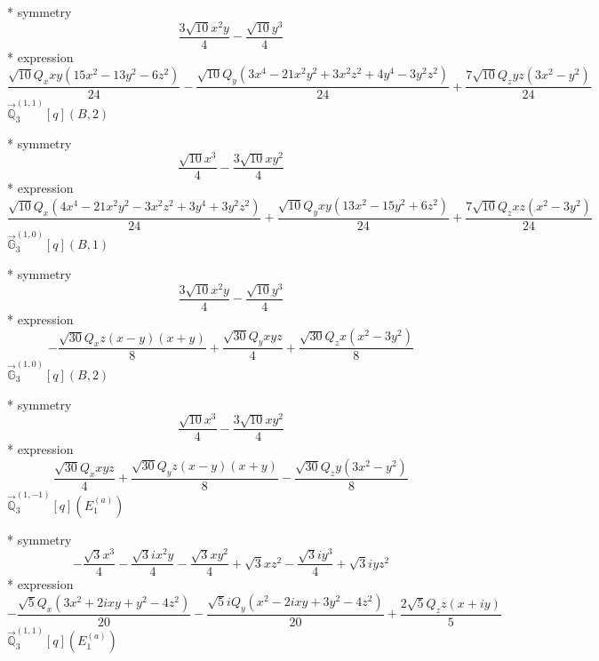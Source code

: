 \documentclass[fleqn,8pt]{jsarticle}
\begin{document}
\noindent\quad ** symmetry
\begin{dmath*}
\frac{3 \sqrt{10} x^{2} y}{4} - \frac{\sqrt{10} y^{3}}{4}
\end{dmath*}
\noindent\quad ** expression
\begin{dmath*}
\frac{\sqrt{10} Q_{x} x y \left(15 x^{2} - 13 y^{2} - 6 z^{2}\right)}{24} - \frac{\sqrt{10} Q_{y} \left(3 x^{4} - 21 x^{2} y^{2} + 3 x^{2} z^{2} + 4 y^{4} - 3 y^{2} z^{2}\right)}{24} + \frac{7 \sqrt{10} Q_{z} y z \left(3 x^{2} - y^{2}\right)}{24}
\end{dmath*}
\noindent\quad $\vec{\mathbb{Q}}_{3}^{(1,1)}[q](B,2)$

\noindent\quad ** symmetry
\begin{dmath*}
\frac{\sqrt{10} x^{3}}{4} - \frac{3 \sqrt{10} x y^{2}}{4}
\end{dmath*}
\noindent\quad ** expression
\begin{dmath*}
\frac{\sqrt{10} Q_{x} \left(4 x^{4} - 21 x^{2} y^{2} - 3 x^{2} z^{2} + 3 y^{4} + 3 y^{2} z^{2}\right)}{24} + \frac{\sqrt{10} Q_{y} x y \left(13 x^{2} - 15 y^{2} + 6 z^{2}\right)}{24} + \frac{7 \sqrt{10} Q_{z} x z \left(x^{2} - 3 y^{2}\right)}{24}
\end{dmath*}
\noindent\quad $\vec{\mathbb{G}}_{3}^{(1,0)}[q](B,1)$

\noindent\quad ** symmetry
\begin{dmath*}
\frac{3 \sqrt{10} x^{2} y}{4} - \frac{\sqrt{10} y^{3}}{4}
\end{dmath*}
\noindent\quad ** expression
\begin{dmath*}
- \frac{\sqrt{30} Q_{x} z \left(x - y\right) \left(x + y\right)}{8} + \frac{\sqrt{30} Q_{y} x y z}{4} + \frac{\sqrt{30} Q_{z} x \left(x^{2} - 3 y^{2}\right)}{8}
\end{dmath*}
\noindent\quad $\vec{\mathbb{G}}_{3}^{(1,0)}[q](B,2)$

\noindent\quad ** symmetry
\begin{dmath*}
\frac{\sqrt{10} x^{3}}{4} - \frac{3 \sqrt{10} x y^{2}}{4}
\end{dmath*}
\noindent\quad ** expression
\begin{dmath*}
\frac{\sqrt{30} Q_{x} x y z}{4} + \frac{\sqrt{30} Q_{y} z \left(x - y\right) \left(x + y\right)}{8} - \frac{\sqrt{30} Q_{z} y \left(3 x^{2} - y^{2}\right)}{8}
\end{dmath*}
\noindent\quad $\vec{\mathbb{Q}}_{3}^{(1,-1)}[q](E_{1}^{(a)})$

\noindent\quad ** symmetry
\begin{dmath*}
- \frac{\sqrt{3} x^{3}}{4} - \frac{\sqrt{3} i x^{2} y}{4} - \frac{\sqrt{3} x y^{2}}{4} + \sqrt{3} x z^{2} - \frac{\sqrt{3} i y^{3}}{4} + \sqrt{3} i y z^{2}
\end{dmath*}
\noindent\quad ** expression
\begin{dmath*}
- \frac{\sqrt{5} Q_{x} \left(3 x^{2} + 2 i x y + y^{2} - 4 z^{2}\right)}{20} - \frac{\sqrt{5} i Q_{y} \left(x^{2} - 2 i x y + 3 y^{2} - 4 z^{2}\right)}{20} + \frac{2 \sqrt{5} Q_{z} z \left(x + i y\right)}{5}
\end{dmath*}
\noindent\quad $\vec{\mathbb{Q}}_{3}^{(1,1)}[q](E_{1}^{(a)})$
\end{document}
